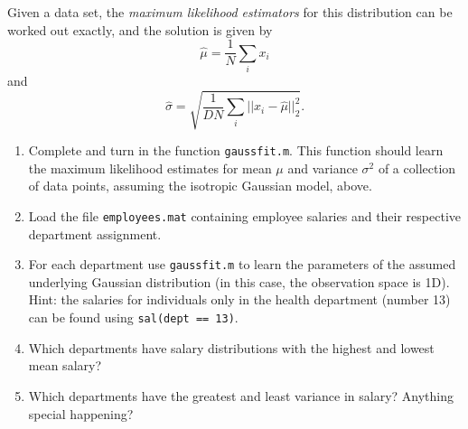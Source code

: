 \documentclass[11pt,noanswers,addpoints]{exam}
\begin{document}
Given a data set, the \emph{maximum likelihood estimators} for this distribution can be worked out exactly, and the solution is given by
$$\hat{\mu} = \frac{1}{N} \sum_i x_i$$
and
$$\hat{\sigma} = \sqrt{\frac{1}{DN} \sum_i||x_i - \hat{\mu}||_2^2}.$$

\begin{enumerate}
\item Complete and turn in the function \texttt{gaussfit.m}. This function should learn the maximum likelihood estimates for  mean $\mu$ and variance $\sigma^2$ of a collection
of data points, assuming the isotropic Gaussian model, above.
\item Load the file \texttt{employees.mat} containing employee salaries and their respective department
assignment. 
\item For each department use \texttt{gaussfit.m} to learn the parameters of the assumed underlying Gaussian
distribution (in this case, the observation space is 1D). Hint: the salaries for individuals only in the health department
(number 13) can be found using \texttt{sal(dept == 13)}.
\item  Which departments have salary distributions with the highest and lowest mean salary? 
\item  Which departments have the greatest and least variance in salary? Anything special happening?
\end{enumerate}
\end{document}
